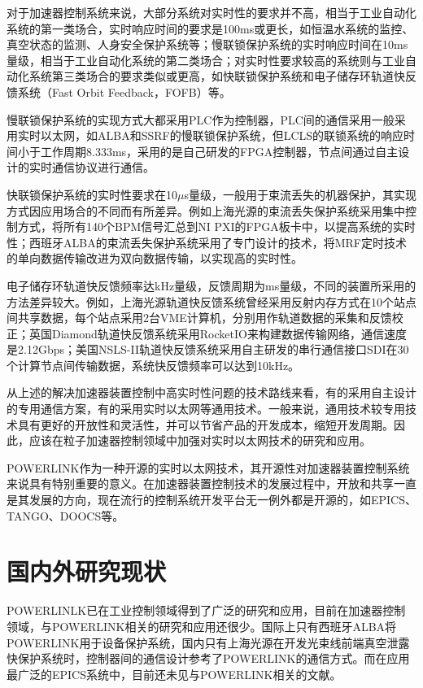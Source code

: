 对于加速器控制系统来说，大部分系统对实时性的要求并不高，相当于工业自动化系统的第一类场合，实时响应时间的要求是100ms或更长，如恒温水系统的监控、真空状态的监测、人身安全保护系统等；慢联锁保护系统的实时响应时间在10ms量级，相当于工业自动化系统的第二类场合；对实时性要求较高的系统则与工业自动化系统第三类场合的要求类似或更高，如快联锁保护系统和电子储存环轨道快反馈系统（Fast Orbit Feedback，FOFB）等。

慢联锁保护系统的实现方式大都采用PLC作为控制器，PLC间的通信采用一般采用实时以太网，如ALBA和SSRF的慢联锁保护系统\cite{Alba-eps,yu2020}，但LCLS的联锁系统的响应时间小于工作周期8.333ms，采用的是自己研发的FPGA控制器，节点间通过自主设计的实时通信协议进行通信\cite{Norum-2009}。

快联锁保护系统的实时性要求在10$\mu$s量级，一般用于束流丢失的机器保护，其实现方式因应用场合的不同而有所差异。例如上海光源的束流丢失保护系统采用集中控制方式，将所有140个BPM信号汇总到NI PXI的FPGA板卡中，以提高系统的实时性\cite{SSRF}；西班牙ALBA的束流丢失保护系统采用了专门设计的技术，将MRF定时技术的单向数据传输改进为双向数据传输，以实现高的实时性\cite{Alba-eps}。


电子储存环轨道快反馈频率达kHz量级，反馈周期为ms量级，不同的装置所采用的方法差异较大。例如，上海光源轨道快反馈系统曾经采用反射内存方式在10个站点间共享数据，每个站点采用2台VME计算机，分别用作轨道数据的采集和反馈校正\cite{SSRF}；英国Diamond轨道快反馈系统采用RocketIO来构建数据传输网络，通信速度是2.12Gbps\cite{DIAMOND-FOFB}；美国NSLS-II轨道快反馈系统采用自主研发的串行通信接口SDI在30个计算节点间传输数据，系统快反馈频率可以达到10kHz\cite{NSLS-II-FOFB}。

从上述的解决加速器装置控制中高实时性问题的技术路线来看，有的采用自主设计的专用通信方案，有的采用实时以太网等通用技术。一般来说，通用技术较专用技术具有更好的开放性和灵活性，并可以节省产品的开发成本，缩短开发周期。因此，应该在粒子加速器控制领域中加强对实时以太网技术的研究和应用。

POWERLINK作为一种开源的实时以太网技术，其开源性对加速器装置控制系统来说具有特别重要的意义。在加速器装置控制技术的发展过程中，开放和共享一直是其发展的方向，现在流行的控制系统开发平台无一例外都是开源的，如EPICS、TANGO、DOOCS等\cite{TANGO,DOOCS}。

\section{国内外研究现状}
POWERLINLK已在工业控制领域得到了广泛的研究和应用\cite{xu-2015,zhu-2014,shi-2012,huang-2012,Seno-2007,cena-2009}，目前在加速器控制领域，与POWERLINK相关的研究和应用还很少。国际上只有西班牙ALBA将POWERLINK用于设备保护系统，国内只有上海光源在开发光束线前端真空泄露快保护系统时，控制器间的通信设计参考了POWERLINK的通信方式。而在应用最广泛的EPICS系统中，目前还未见与POWERLINK相关的文献。

